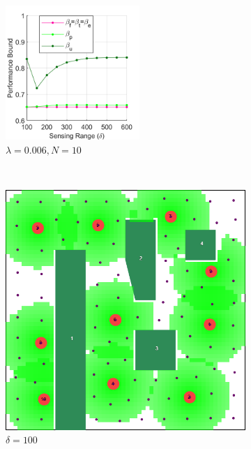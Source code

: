 \documentclass[conference]{IEEEtran}
\begin{document}
\begin{figure}[t]
    \centering
    \begin{subfigure}[t]{\columnwidth}
        \centering
        \includegraphics[width=2in]{Figures/Gen1.png}
        \caption{$\lambda=0.006, N=10$}
    \end{subfigure}%
    \\
    \centering
    \begin{subfigure}[t]{0.105\textwidth}
        \centering
        \includegraphics[width=\textwidth]{Figures/Gen1_1.png}
        \caption{$\delta=100$}
    \end{subfigure}\hspace{3mm}
    \begin{subfigure}[t]{0.105\textwidth}
        \centering

\end{subfigure}
\end{figure}
\end{document}
